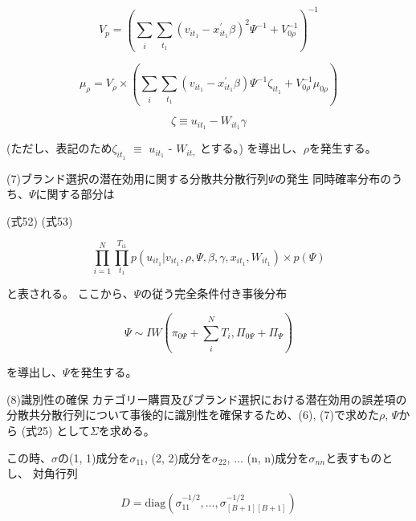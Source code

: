 \documentclass[11pt]{jsarticle}
\begin{document}
\begin{equation} \label{formula51}
V_{p} = 
\left(
\sum_{\substack{i}} \sum_{\substack{t_{1}}} (v_{it_{1}} - x^{\prime}_{it_{1}} \beta)^2 \Psi^{-1} + V^{-1}_{0\rho}
\right)^{-1}
\end{equation}

\begin{equation} \label{formula52}
\mu_{\rho} = V_{\rho} \times 
\left(
\sum_{\substack{i}} \sum_{\substack{t_{1}}} (v_{it_{1}} - x^{\prime}_{it_{1}} \beta) \Psi^{-1} \zeta_{it_{1}} + V^{-1}_{0\rho} \mu_{0\rho}
\right)
\end{equation}

\begin{equation} \label{formula52-1}
\zeta \equiv u_{it_{1}} - W_{it_{1}} \gamma
\end{equation}

(ただし、表記のため$\zeta_{it_{1}}$ $\equiv$ $u_{it_{1}}$ - $W_{it_{\gamma}}$ とする。)
を導出し、$\rho$を発生する。

(7)ブランド選択の潜在効用に関する分散共分散行列$\Psi$の発生
同時確率分布のうち、$\Psi$に関する部分は

(式52)
(式53)

\begin{equation} \label{formula53}
\prod_{i=1}^{N} \prod_{t_{1}}^{T_{i1}} p(u_{it_{1}} | v_{it_{1}}, \rho, \Psi, \beta, \gamma, x_{it_{1}}, W_{it_{1}}) \times p(\Psi)
\end{equation}

と表される。
ここから、$\Psi$の従う完全条件付き事後分布

\begin{equation} \label{formula54}
\Psi \sim IW
\left(
\pi_{0\Psi} + \sum_{\substack{i}}^{\substack{N}} T_{i}, \Pi_{0\Psi} + \Pi_{\Psi}
\right)
\end{equation}

を導出し、$\Psi$を発生する。

(8)識別性の確保
カテゴリー購買及びブランド選択における潜在効用の誤差項の分散共分散行列について事後的に識別性を確保するため、(6), (7)で求めた$\rho$, $\Psi$から
(式25)
として$\Sigma$を求める。

この時、$\sigma$の(1, 1)成分を$\sigma_{11}$, (2, 2)成分を$\sigma_{22}$, $\ldots$ (n, n)成分を$\sigma_{nn}$と表すものとし、
対角行列

\begin{equation} \label{formula55}
D = \mbox{diag} (\sigma_{11}^{-1/2}, \ldots, \sigma_{[B+1][B+1]}^{-1/2})
\end{equation}
\end{document}
